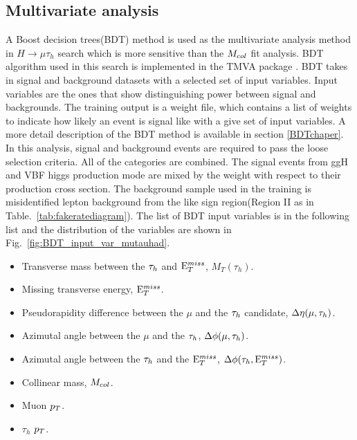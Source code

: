 \subsection{Multivariate analysis}
A Boost decision trees(BDT) method is used as the multivariate analysis method in $H\rightarrow\mu\tau_h$ search which is more sensitive than the $M_{col}$ fit analysis. BDT algorithm used in this search is implemented in the TMVA package \cite{TMVAnote}. BDT takes in signal and background datasets with a selected set of input variables. Input variables are the ones that show distinguishing power between signal and backgrounds. The training output is a weight file, which contains a list of weights to indicate how likely an event is signal like with a give set of input variables. A more detail description of the BDT method is available in section \ref{BDTchaper}.  In this analysis, signal and background events are required to pass the loose selection criteria. All of the categories are combined. The signal events from ggH and VBF higgs production mode are mixed by the weight with respect to their production cross section. The background sample used in the training is misidentified lepton background from the like sign region(Region II as in Table.~\ref{tab:fakeratediagram}). The list of BDT input variables  is in the following list and the distribution of the variables are shown in Fig.~\ref{fig:BDT_input_var_mutauhad}.

\begin{itemize}
\item Transverse mass between the $\tau_{h}$ and $\mathrm{E}_{T}^{miss}$, $M_{T}(\tau_{h})$.
\item Missing transverse energy, $\mathrm{E}_{T}^{miss}$.
\item Pseudorapidity difference between the $\mu$ and the $\tau_{h}$ candidate, $\Delta\eta(\mu, \tau_{h})$.
\item Azimutal angle between the $\mu$ and the $\tau_{h}$, $\Delta\phi (\mu,\tau_{h})$.
\item Azimutal angle between the $\tau_{h}$ and the $\mathrm{E}_{T}^{miss}$, $\Delta\phi(\tau_h,\mathrm{E}_{T}^{miss})$.
\item Collinear mass, $M_{col}$.
\item Muon $p_{T}$.
\item $\tau_h$ $p_{T}$.
\end{itemize}

